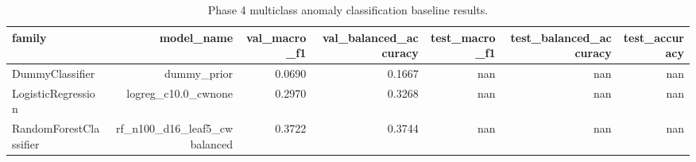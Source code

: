 \begin{table}[t]
\centering
\caption{Phase 4 multiclass anomaly classification baseline results.}
\label{tab:phase4_multiclass_main}
\begin{tabular}{lrrrrrr}
\hline
family & model\_name & val\_macro\_f1 & val\_balanced\_accuracy & test\_macro\_f1 & test\_balanced\_accuracy & test\_accuracy \\
\hline
DummyClassifier & dummy\_prior & 0.0690 & 0.1667 & nan & nan & nan \\
LogisticRegression & logreg\_c10.0\_cwnone & 0.2970 & 0.3268 & nan & nan & nan \\
RandomForestClassifier & rf\_n100\_d16\_leaf5\_cwbalanced & 0.3722 & 0.3744 & nan & nan & nan \\
\hline
\end{tabular}
\end{table}
